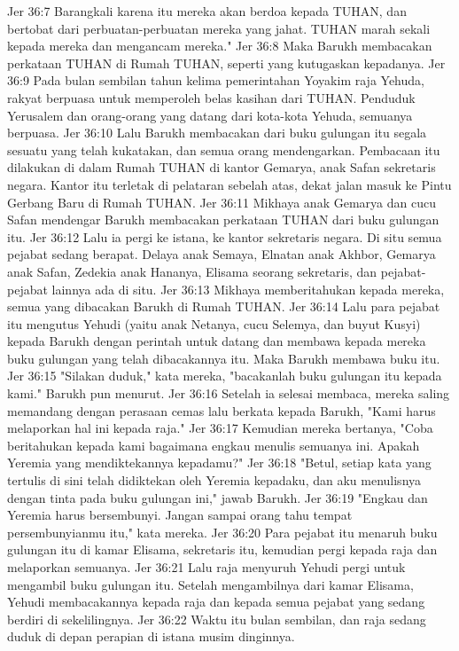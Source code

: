 Jer 36:7  Barangkali karena itu mereka akan berdoa kepada TUHAN, dan bertobat dari perbuatan-perbuatan mereka yang jahat. TUHAN marah sekali kepada mereka dan mengancam mereka."
Jer 36:8  Maka Barukh membacakan perkataan TUHAN di Rumah TUHAN, seperti yang kutugaskan kepadanya.
Jer 36:9  Pada bulan sembilan tahun kelima pemerintahan Yoyakim raja Yehuda, rakyat berpuasa untuk memperoleh belas kasihan dari TUHAN. Penduduk Yerusalem dan orang-orang yang datang dari kota-kota Yehuda, semuanya berpuasa.
Jer 36:10  Lalu Barukh membacakan dari buku gulungan itu segala sesuatu yang telah kukatakan, dan semua orang mendengarkan. Pembacaan itu dilakukan di dalam Rumah TUHAN di kantor Gemarya, anak Safan sekretaris negara. Kantor itu terletak di pelataran sebelah atas, dekat jalan masuk ke Pintu Gerbang Baru di Rumah TUHAN.
Jer 36:11  Mikhaya anak Gemarya dan cucu Safan mendengar Barukh membacakan perkataan TUHAN dari buku gulungan itu.
Jer 36:12  Lalu ia pergi ke istana, ke kantor sekretaris negara. Di situ semua pejabat sedang berapat. Delaya anak Semaya, Elnatan anak Akhbor, Gemarya anak Safan, Zedekia anak Hananya, Elisama seorang sekretaris, dan pejabat-pejabat lainnya ada di situ.
Jer 36:13  Mikhaya memberitahukan kepada mereka, semua yang dibacakan Barukh di Rumah TUHAN.
Jer 36:14  Lalu para pejabat itu mengutus Yehudi (yaitu anak Netanya, cucu Selemya, dan buyut Kusyi) kepada Barukh dengan perintah untuk datang dan membawa kepada mereka buku gulungan yang telah dibacakannya itu. Maka Barukh membawa buku itu.
Jer 36:15  "Silakan duduk," kata mereka, "bacakanlah buku gulungan itu kepada kami." Barukh pun menurut.
Jer 36:16  Setelah ia selesai membaca, mereka saling memandang dengan perasaan cemas lalu berkata kepada Barukh, "Kami harus melaporkan hal ini kepada raja."
Jer 36:17  Kemudian mereka bertanya, "Coba beritahukan kepada kami bagaimana engkau menulis semuanya ini. Apakah Yeremia yang mendiktekannya kepadamu?"
Jer 36:18  "Betul, setiap kata yang tertulis di sini telah didiktekan oleh Yeremia kepadaku, dan aku menulisnya dengan tinta pada buku gulungan ini," jawab Barukh.
Jer 36:19  "Engkau dan Yeremia harus bersembunyi. Jangan sampai orang tahu tempat persembunyianmu itu," kata mereka.
Jer 36:20  Para pejabat itu menaruh buku gulungan itu di kamar Elisama, sekretaris itu, kemudian pergi kepada raja dan melaporkan semuanya.
Jer 36:21  Lalu raja menyuruh Yehudi pergi untuk mengambil buku gulungan itu. Setelah mengambilnya dari kamar Elisama, Yehudi membacakannya kepada raja dan kepada semua pejabat yang sedang berdiri di sekelilingnya.
Jer 36:22  Waktu itu bulan sembilan, dan raja sedang duduk di depan perapian di istana musim dinginnya.
